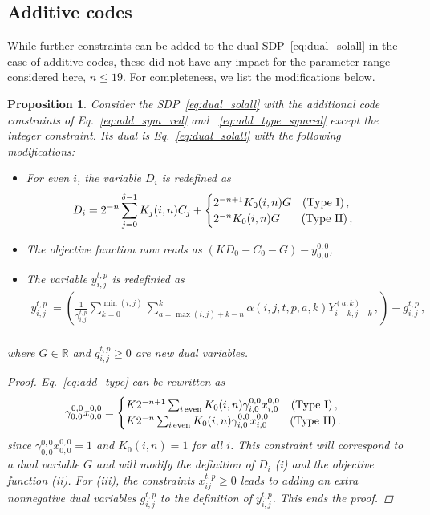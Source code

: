 \documentclass[12pt,a4paper]{amsart}
\newtheorem{proposition}[theorem]{Proposition}
\newcommand{\R}{\mathds{R}}
\newcommand{\nn}{\nonumber}
\begin{document}
\subsection{Additive codes}
While further constraints can be added to the dual SDP~\eqref{eq:dual_solall} in the case of additive codes, these did not have any impact for the parameter range considered here, $n\leq 19$.
For completeness, we list the modifications below.
% 
\begin{proposition}\label{rmk:additive codes}
    Consider the SDP~\eqref{eq:dual_solall} 
    with the additional code constraints of Eq.~\eqref{eq:add_sym_red} and ~\eqref{eq:add_type_symred}
    except
    the integer constraint.
    Its dual is Eq.~\eqref{eq:dual_solall} with the following modifications:
%
\begin{itemize}
    \item[(i)] For even $i$, the variable $D_i$ is redefined as
    \begin{align}
    D_i = 2^{-n} \sum^{\delta-1}_{j=0} K_j(i,n)  C_{j} +\begin{cases}  2^{-n+1}  K_0(i,n)G    \quad \text{(Type I)} \,, \\  2^{-n}K_0(i,n)G \quad\hspace{0.32cm} \text{(Type II)} \,,\end{cases} 
    \end{align}
    \item[(ii)] The objective function now reads as $(KD_0 - C_0 - G) -y^{0,0}_{0,0}$,
    \item[(iii)] The variable $y^{t,p}_{i,j}$ is redefinied as
    \begin{align}
    y^{t,p}_{i,j}\ = \left(\frac{1}{\gamma^{t,p}_{i,j}} \sum^{\min(i,j)}_{k=0} \sum^k_{a=\max(i,j)+k-n} \alpha(i,j,t,p,a,k) Y^{(a,k)}_{i-k,j-k} \,,\right) + g^{t,p}_{i,j}\,, \nn \\
    \end{align}
 \end{itemize}
 where $G \in \R$ and $g^{t,p}_{i,j}\geq 0$ are new dual variables.
 \begin{proof} 
 Eq.~\eqref{eq:add_type} can be rewritten as 
\begin{align}
    \gamma^{0,0}_{0,0} x^{0,0}_{0,0}=\begin{cases}  K2^{-n+1}\sum_{i \,\text{even}} K_0(i,n)\gamma^{0,0}_{i,0} x^{0,0}_{i,0}  \quad \text{(Type I)} \,, \\   K2^{-n}\sum_{i \,\text{even}} K_0(i,n)\gamma^{0,0}_{i,0} x^{0,0}_{i,0} \quad\hspace{0.32cm} \text{(Type II)} \,.\end{cases} 
\end{align}
% 
since $\gamma^{0,0}_{0,0} x^{0,0}_{0,0}=1$ and $K_0(i,n)=1$ for all $i$. This constraint will correspond to a dual variable $G$ and will modify the definition of $D_i$ (i) and the objective function (ii).
% 
For (iii), the constraints $x^{t,p}_{ij}\geq 0$ leads to adding an extra nonnegative dual variables $g^{t,p}_{i,j}$ to the definition of $y^{t,p}_{i,j}$.  This ends the proof.
% 
 \end{proof}
\end{proposition}
\end{document}
